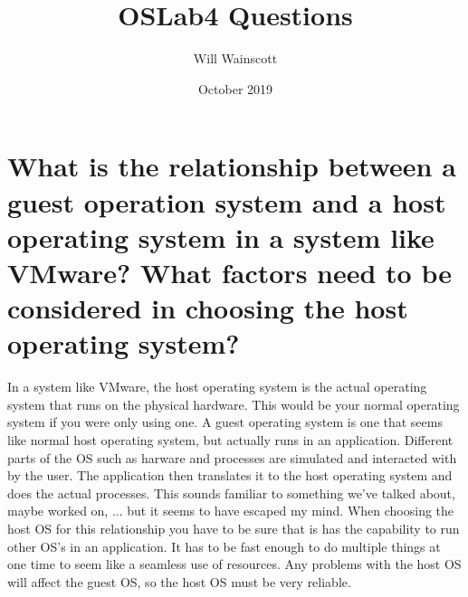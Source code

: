 \documentclass{article}
\title{OSLab4 Questions}
\author{Will Wainscott}
\date{October 2019}
\begin{document}
\maketitle

\section{What is the relationship between a guest operation system and a host operating system in a system like VMware? What factors need to be considered in choosing the host operating system?}

In a system like VMware, the host operating system is the actual operating system that runs on the physical hardware. This would be your normal operating system if you were only using one. A guest operating system is one that seems like normal host operating system, but actually runs in an application. Different parts of the OS such as harware and processes are simulated and interacted with by the user. The application then translates it to the host operating system and does the actual processes. This sounds familiar to something we've talked about, maybe worked on, ... but it seems to have escaped my mind. When choosing the host OS for this relationship you have to be sure that is has the capability to run other OS's in an application. It has to be fast enough to do multiple things at one time to seem like a seamless use of resources. Any problems with the host OS will affect the guest OS, so the host OS must be very reliable. 
\end{document}

